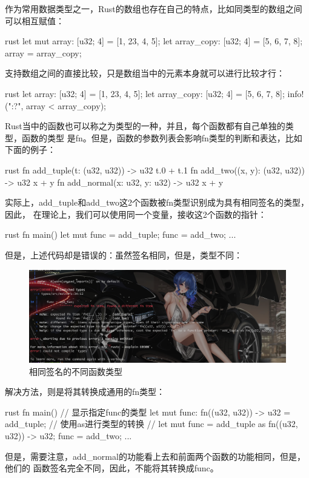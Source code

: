 作为常用数据类型之一，Rust的数组也存在自己的特点，比如同类型的数组之间可以相互赋值：
\begin{code-block}{rust}
let mut array: [u32; 4] = [1, 23, 4, 5];
let array_copy: [u32; 4] = [5, 6, 7, 8];
array = array_copy;
\end{code-block}
支持数组之间的直接比较，只是数组当中的元素本身就可以进行比较才行：
\begin{code-block}{rust}
let array: [u32; 4] = [1, 23, 4, 5];
let array_copy: [u32; 4] = [5, 6, 7, 8];
info!("{:?}", array < array_copy);
\end{code-block}

Rust当中的函数也可以称之为类型的一种，并且，每个函数都有自己单独的类型，函数的类型
是fn。但是，函数的参数列表会影响fn类型的判断和表达，比如下面的例子：
\begin{code-block}{rust}
fn add_tuple(t: (u32, u32)) -> u32 {
    t.0 + t.1
}
fn add_two((x, y): (u32, u32)) -> u32 {
    x + y
}
fn add_normal(x: u32, y: u32) -> u32 {
    x + y
}
\end{code-block}
实际上，add\_tuple和add\_two这2个函数被fn类型识别成为具有相同签名的类型，因此，
在理论上，我们可以使用同一个变量，接收这2个函数的指针：
\begin{code-block}{rust}
fn main() {
    let mut func = add_tuple;
    func = add_two;
    ...
}
\end{code-block}
但是，上述代码却是错误的：虽然签名相同，但是，类型不同：
\begin{figure}[H]
  \centering
  \includegraphics[width=\linewidth]{rust_func_type.png}
  \caption{相同签名的不同函数类型}
  \label{fig:rust_func_type}
\end{figure}
解决方法，则是将其转换成通用的fn类型：
\begin{code-block}{rust}
fn main() {
    // 显示指定func的类型
    let mut func: fn((u32, u32)) -> u32 = add_tuple;
    // 使用as进行类型的转换
    // let mut func = add_tuple as fn((u32, u32)) -> u32;
    func = add_two;
    ...
}
\end{code-block}
但是，需要注意，add\_normal的功能看上去和前面两个函数的功能相同，但是，他们的
函数签名完全不同，因此，不能将其转换成func。

